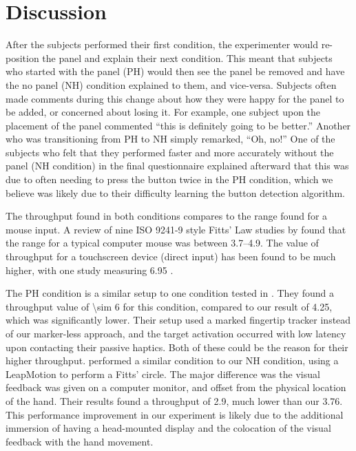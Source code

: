 \section{Discussion}

After the subjects performed their first condition, the experimenter would re-position the panel and explain their next condition.
This meant that subjects who started with the panel (PH) would then see the panel be removed and have the no panel (NH) condition explained to them, and vice-versa.
Subjects often made comments during this change about how they were happy for the panel to be added, or concerned about losing it.
For example, one subject upon the placement of the panel commented ``this is definitely going to be better.''
Another who was transitioning from PH to NH simply remarked, ``Oh, no!''
One of the subjects who felt that they performed faster and more accurately without the panel (NH condition) in the final questionnaire explained afterward that this was due to often needing to press the button twice in the PH condition, which we believe was likely due to their difficulty learning the button detection algorithm.

The throughput found in both conditions compares to the range found for a mouse input.
A review of nine ISO 9241-9 style Fitts' Law studies by \citet{soukoreff_towards_2004} found that the range for a typical computer mouse was between \SIrange[range-phrase = {~and~}]{3.7}{4.9}{\bps}.
The value of throughput for a touchscreen device (direct input) has been found to be much higher, with one study measuring \SI{6.95}{\bps} \citep{mackenzie_fitts_2015}.

The PH condition is a similar setup to one condition tested in \citet{kohli_redirected_2012}.
They found a throughput value of \SI{\sim 6}{\bps} for this condition, compared to our result of \SI{4.25}{\bps}, which was significantly lower.
Their setup used a marked fingertip tracker instead of our marker-less approach, and the target activation occurred with low latency upon contacting their passive haptics.
Both of these could be the reason for their higher throughput.
\citet{seixas_one_2015} performed a similar condition to our NH condition, using a LeapMotion to perform a Fitts' circle.
The major difference was the visual feedback was given on a computer monitor, and offset from the physical location of the hand.
Their results found a throughput of \SI{2.9}{\bps}, much lower than our \SI{3.76}{\bps}.
This performance improvement in our experiment is likely due to the additional immersion of having a head-mounted display and the colocation of the visual feedback with the hand movement.

